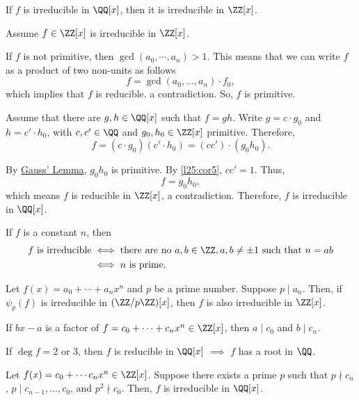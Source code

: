 \begin{dem}[of $i$]
	If $f$ is irreducible in $\QQ[x]$, then it is irreducible in $\ZZ[x]$.

	Assume $f \in \ZZ[x]$ is irreducible in $\ZZ[x]$.

	If $f$ is not primitive, then $\gcd(a_0, \cdots, a_n) > 1$. This means that we can write $f$ as a product of two non-units as follows \[f = \gcd(a_0, \dots, a_n) \cdot f_0,\] which implies that $f $ is reducible. a contradiction. So, $f$ is primitive.

	Assume that  there are $g, h \in \QQ[x]$ such that $f = gh$. Write $g = c\cdot g_0$ and $h = c'\cdot h_0$, with $c, c' \in \QQ$ and $g_0, h_0 \in \ZZ[x]$ primitive. Therefore, \[f = (c\cdot g_0) (c' \cdot h_0) = (cc')\cdot(g_0h_0).\]

	By \hyperref[l25:gauss]{Gauss' Lemma},  $g_0h_0$ is primitive. By \cref{l25:cor5}, $cc' = 1$. Thus, \[f = g_0h_0, \] which means $f$ is reducible in $\ZZ[x]$, a contradiction. Therefore, $f$ is irreducible in $\QQ[x]$.
\end{dem}

\begin{dem}[of $ii$]
	If $f$ is a constant $n$, then
	 \begin{align*}
		 \text{$f$ is irreducible} & \iff \text{there are no $a, b \in \ZZ, a, b \neq \pm 1$ such that $n = ab$} \\
		 & \iff \text{$n$ is prime.}
	\end{align*}
\end{dem}

\begin{prop}
	Let $f(x) = a_0 + \cdots + a_nx^n$ and $p$ be a prime number. Suppose $p \mid a_n$. Then, if  $\psi_p(f)$ is irreducible in $(\ZZ/p\ZZ)[x]$, then $f$ is also irreducible in $\ZZ[x]$.
\end{prop}

\begin{prop}
	If $bx - a$ is a factor of $f = c_0 + \cdots + c_nx^n \in \ZZ[x]$, then $a \mid c_0$ and $b \mid c_n$.
\end{prop}

\begin{prop}
	If $\deg f = 2$ or $3$, then $f$ is reducible in $\QQ[x]$ $\implies$ $f$ has a root in $\QQ$.
\end{prop}

\begin{prop}\label{l26:eisenstein}
	Let $f(x) = c_0 + \cdots c_nx^n \in \ZZ[x]$.
	Suppose there exists a prime $p$ such that $p \nmid c_n$, $p \mid c_{n-1}, \dots, c_0$, and  $p^2 \nmid c_0$.
	Then, $f$ is irreducible in $\QQ[x]$.
\end{prop}
